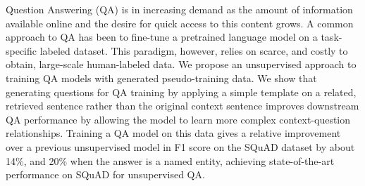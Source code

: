 Question Answering (QA) is in increasing demand as the amount of information available online and the desire for quick access to this content grows. A common approach to QA has been to fine-tune a pretrained language model on a task-specific labeled dataset. This paradigm, however, relies on scarce, and costly to obtain, large-scale human-labeled data. We propose an unsupervised approach to training QA models with generated pseudo-training data. We show that generating questions for QA training by applying a simple template on a related, retrieved sentence rather than the original context sentence improves downstream QA performance by allowing the model to learn more complex context-question relationships. Training a QA model on this data gives a relative improvement over a previous unsupervised model in F1 score on the SQuAD dataset by about 14\%, and 20\% when the answer is a named entity, achieving state-of-the-art performance on SQuAD for unsupervised QA.
